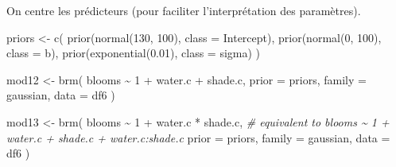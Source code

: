 \documentclass[
  a4paper,11pt,twoside,onecolumn,openright,final,oldfontcommands]{memoir}
\newenvironment{Shaded}{\begin{snugshade}}{\end{snugshade}}
\newcommand{\AttributeTok}[1]{\textcolor[rgb]{0.77,0.63,0.00}{#1}}
\newcommand{\CommentTok}[1]{\textcolor[rgb]{0.56,0.35,0.01}{\textit{#1}}}
\newcommand{\DecValTok}[1]{\textcolor[rgb]{0.00,0.00,0.81}{#1}}
\newcommand{\FloatTok}[1]{\textcolor[rgb]{0.00,0.00,0.81}{#1}}
\newcommand{\FunctionTok}[1]{\textcolor[rgb]{0.00,0.00,0.00}{#1}}
\newcommand{\NormalTok}[1]{#1}
\newcommand{\OtherTok}[1]{\textcolor[rgb]{0.56,0.35,0.01}{#1}}
\newcommand{\SpecialCharTok}[1]{\textcolor[rgb]{0.00,0.00,0.00}{#1}}
\theoremstyle{definition}
\theoremstyle{definition}
\theoremstyle{definition}
\theoremstyle{definition}
\theoremstyle{remark}
\begin{document}
On centre les prédicteurs (pour faciliter l'interprétation des paramètres).

\begin{Shaded}
\end{Shaded}

\begin{Shaded}
\begin{Highlighting}[]
\NormalTok{priors }\OtherTok{\textless{}{-}} \FunctionTok{c}\NormalTok{(}
  \FunctionTok{prior}\NormalTok{(}\FunctionTok{normal}\NormalTok{(}\DecValTok{130}\NormalTok{, }\DecValTok{100}\NormalTok{), }\AttributeTok{class =}\NormalTok{ Intercept),}
  \FunctionTok{prior}\NormalTok{(}\FunctionTok{normal}\NormalTok{(}\DecValTok{0}\NormalTok{, }\DecValTok{100}\NormalTok{), }\AttributeTok{class =}\NormalTok{ b),}
  \FunctionTok{prior}\NormalTok{(}\FunctionTok{exponential}\NormalTok{(}\FloatTok{0.01}\NormalTok{), }\AttributeTok{class =}\NormalTok{ sigma)}
\NormalTok{  )}

\NormalTok{mod12 }\OtherTok{\textless{}{-}} \FunctionTok{brm}\NormalTok{(}
\NormalTok{  blooms }\SpecialCharTok{\textasciitilde{}} \DecValTok{1} \SpecialCharTok{+}\NormalTok{ water.c }\SpecialCharTok{+}\NormalTok{ shade.c,}
  \AttributeTok{prior =}\NormalTok{ priors,}
  \AttributeTok{family =}\NormalTok{ gaussian,}
  \AttributeTok{data =}\NormalTok{ df6}
\NormalTok{  )}
\end{Highlighting}
\end{Shaded}

\begin{Shaded}
\begin{Highlighting}[]
\NormalTok{mod13 }\OtherTok{\textless{}{-}} \FunctionTok{brm}\NormalTok{(}
\NormalTok{  blooms }\SpecialCharTok{\textasciitilde{}} \DecValTok{1} \SpecialCharTok{+}\NormalTok{ water.c }\SpecialCharTok{*}\NormalTok{ shade.c,}
  \CommentTok{\# equivalent to blooms \textasciitilde{} 1 + water.c + shade.c + water.c:shade.c}
  \AttributeTok{prior =}\NormalTok{ priors,}
  \AttributeTok{family =}\NormalTok{ gaussian,}
  \AttributeTok{data =}\NormalTok{ df6}
\NormalTok{  )}
\end{Highlighting}
\end{Shaded}
\end{document}
